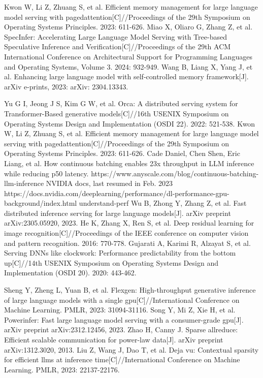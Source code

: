 \documentclass[conference]{IEEEtran}
\begin{document}
\begin{thebibliography}{00}
     Kwon W, Li Z, Zhuang S, et al. Efficient memory management for large language model serving with pagedattention[C]//Proceedings of the 29th Symposium on Operating Systems Principles. 2023: 611-626.
     Miao X, Oliaro G, Zhang Z, et al. SpecInfer: Accelerating Large Language Model Serving with Tree-based Speculative Inference and Verification[C]//Proceedings of the 29th ACM International Conference on Architectural Support for Programming Languages and Operating Systems, Volume 3. 2024: 932-949.
     Wang B, Liang X, Yang J, et al. Enhancing large language model with self-controlled memory framework[J]. arXiv e-prints, 2023: arXiv: 2304.13343.

     Yu G I, Jeong J S, Kim G W, et al. Orca: A distributed serving system for Transformer-Based generative models[C]//16th USENIX Symposium on Operating Systems Design and Implementation (OSDI 22). 2022: 521-538.
     Kwon W, Li Z, Zhuang S, et al. Efficient memory management for large language model serving with pagedattention[C]//Proceedings of the 29th Symposium on Operating Systems Principles. 2023: 611-626.
     Cade Daniel, Chen Shen, Eric Liang, et al.  How continuous batching enables 23x throughput in LLM inference while reducing p50 latency. https://www.anyscale.com/blog/continuous-batching-llm-inference
     NVIDIA docs, last resumed in Feb. 2023 https://docs.nvidia.com/deeplearning/performance/dl-performance-gpu-background/index.html understand-perf
     Wu B, Zhong Y, Zhang Z, et al. Fast distributed inference serving for large language models[J]. arXiv preprint arXiv:2305.05920, 2023.
     He K, Zhang X, Ren S, et al. Deep residual learning for image recognition[C]//Proceedings of the IEEE conference on computer vision and pattern recognition. 2016: 770-778.
     Gujarati A, Karimi R, Alzayat S, et al. Serving DNNs like clockwork: Performance predictability from the bottom up[C]//14th USENIX Symposium on Operating Systems Design and Implementation (OSDI 20). 2020: 443-462.

    Sheng Y, Zheng L, Yuan B, et al. Flexgen: High-throughput generative inference of large language models with a single gpu[C]//International Conference on Machine Learning. PMLR, 2023: 31094-31116.
    Song Y, Mi Z, Xie H, et al. Powerinfer: Fast large language model serving with a consumer-grade gpu[J]. arXiv preprint arXiv:2312.12456, 2023.
    Zhao H, Canny J. Sparse allreduce: Efficient scalable communication for power-law data[J]. arXiv preprint arXiv:1312.3020, 2013.
    Liu Z, Wang J, Dao T, et al. Deja vu: Contextual sparsity for efficient llms at inference time[C]//International Conference on Machine Learning. PMLR, 2023: 22137-22176.
\end{thebibliography}
\vspace{12pt}
\end{document}
